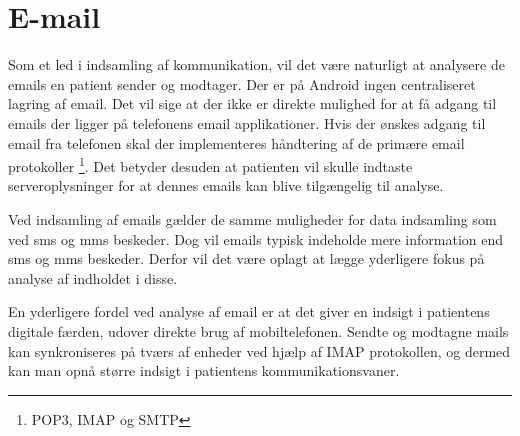 \section{E-mail}
Som et led i indsamling af kommunikation, vil det være naturligt at analysere de emails en patient sender og modtager.
Der er på Android ingen centraliseret lagring af email.
Det vil sige at der ikke er direkte mulighed for at få adgang til emails der ligger på telefonens email applikationer.
Hvis der ønskes adgang til email fra telefonen skal der implementeres håndtering af de primære email protokoller \footnote{POP3, IMAP og SMTP}.
Det betyder desuden at patienten vil skulle indtaste serveroplysninger for at dennes emails kan blive tilgængelig til analyse.

Ved indsamling af emails gælder de samme muligheder for data indsamling som ved sms og mms beskeder.
Dog vil emails typisk indeholde mere information end sms og mms beskeder.
Derfor vil det være oplagt at lægge yderligere fokus på analyse af indholdet i disse.

En yderligere fordel ved analyse af email er at det giver en indsigt i patientens digitale færden, udover direkte brug af mobiltelefonen.
Sendte og modtagne mails kan synkroniseres på tværs af enheder ved hjælp af IMAP protokollen, og dermed kan man opnå større indsigt i patientens kommunikationsvaner.